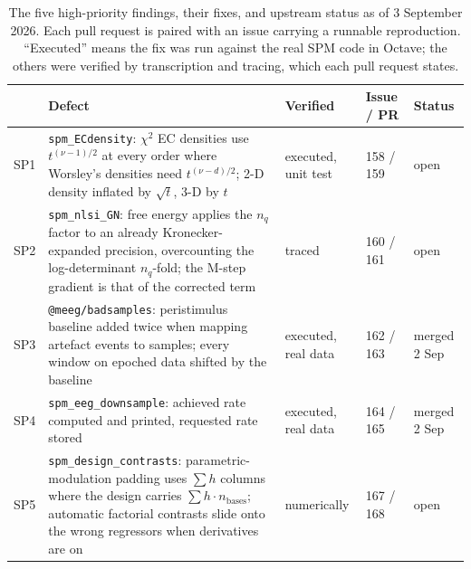 \documentclass[11pt]{article}
\newcommand{\code}[1]{\texttt{#1}}
\begin{document}
\begin{table}[t]
\centering\small
\caption{The five high-priority findings, their fixes, and upstream status as of 3 September 2026. Each pull request is paired with an issue carrying a runnable reproduction. ``Executed'' means the fix was run against the real SPM code in Octave; the others were verified by transcription and tracing, which each pull request states.}
\label{tab:tier1}
\begin{tabular}{@{}lp{6.9cm}lll@{}}
\toprule
 & Defect & Verified & Issue / PR & Status \\
\midrule
SP1 & \code{spm\_ECdensity}: $\chi^2$ EC densities use $t^{(\nu-1)/2}$ at every order where Worsley's densities need $t^{(\nu-d)/2}$; 2-D density inflated by $\sqrt t$, 3-D by $t$ & executed, unit test & 158 / 159 & open \\
SP2 & \code{spm\_nlsi\_GN}: free energy applies the $n_q$ factor to an already Kronecker-expanded precision, overcounting the log-determinant $n_q$-fold; the M-step gradient is that of the corrected term & traced & 160 / 161 & open \\
SP3 & \code{@meeg/badsamples}: peristimulus baseline added twice when mapping artefact events to samples; every window on epoched data shifted by the baseline & executed, real data & 162 / 163 & merged 2 Sep \\
SP4 & \code{spm\_eeg\_downsample}: achieved rate computed and printed, requested rate stored & executed, real data & 164 / 165 & merged 2 Sep \\
SP5 & \code{spm\_design\_contrasts}: parametric-modulation padding uses $\sum h$ columns where the design carries $\sum h \cdot n_{\mathrm{bases}}$; automatic factorial contrasts slide onto the wrong regressors when derivatives are on & numerically & 167 / 168 & open \\
\bottomrule
\end{tabular}
\end{table}
\end{document}
